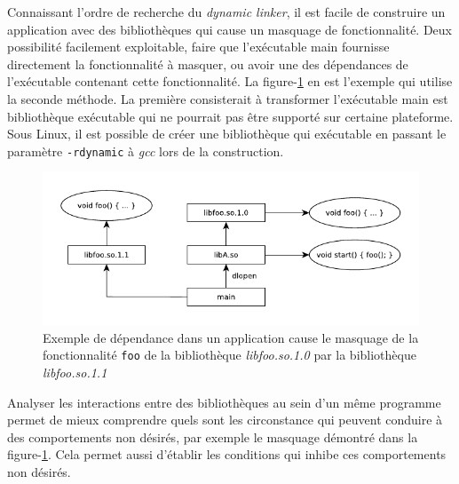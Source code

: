 \documentclass[12pt,initial,twoside,maitrise]{dms}
\numberwithin{equation}{section}
\numberwithin{table}{chapter}
\numberwithin{figure}{chapter}
\begin{document}

Connaissant l'ordre de recherche du \textit{dynamic linker}, il est facile de construire un application avec des bibliothèques
qui cause un masquage de fonctionnalité. Deux possibilité facilement exploitable, faire que l'exécutable main fournisse
directement la fonctionnalité à masquer, ou avoir une des dépendances de l'exécutable contenant cette fonctionnalité. La figure-\ref{fig:deps-ex2}
en est l'exemple qui utilise la seconde méthode. La première consisterait à transformer l'exécutable main est bibliothèque
exécutable qui ne pourrait pas être supporté sur certaine plateforme. Sous Linux, il est possible de créer une bibliothèque qui
exécutable en passant le paramètre \texttt{-rdynamic} à \textit{gcc} lors de la construction.

\begin{center}
    \begin{figure}[ht]
        \includegraphics{figures/libdeps-ex2.pdf}
        \caption{Exemple de dépendance dans un application cause le masquage de la fonctionnalité \texttt{foo}
        de la bibliothèque \textit{libfoo.so.1.0} par la bibliothèque \textit{libfoo.so.1.1}}
        \label{fig:deps-ex2}
    \end{figure}
\end{center}


Analyser les interactions entre des bibliothèques au sein d'un même programme permet de
mieux comprendre quels sont les circonstance qui peuvent conduire à des comportements
non désirés, par exemple le masquage démontré dans la figure-\ref{fig:deps-ex2}.
Cela permet aussi d'établir les conditions qui inhibe ces comportements non désirés.
\end{document}
